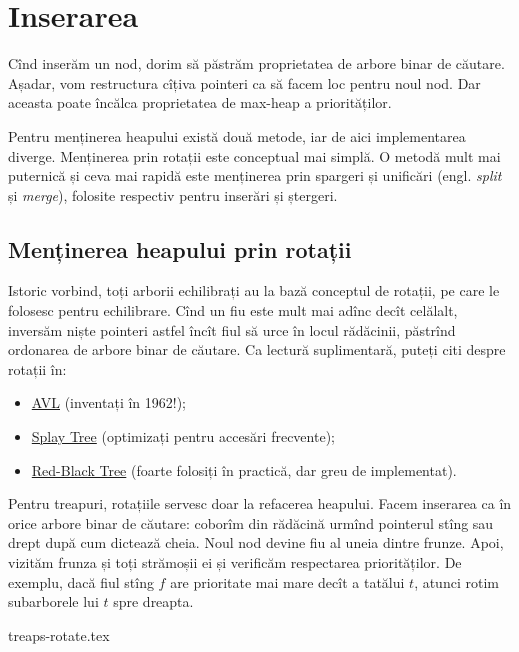 \documentclass[../main.tex]{subfiles}
\begin{document}
\section{Inserarea}

Cînd inserăm un nod, dorim să păstrăm proprietatea de arbore binar de căutare. Așadar, vom restructura cîțiva pointeri ca să facem loc pentru noul nod. Dar aceasta poate încălca proprietatea de max-heap a priorităților.

Pentru menținerea heapului există două metode, iar de aici implementarea diverge. Menținerea prin rotații este conceptual mai simplă. O metodă mult mai puternică și ceva mai rapidă este menținerea prin spargeri și unificări (engl. \textit{split} și \textit{merge}), folosite respectiv pentru inserări și ștergeri.

\subsection{Menținerea heapului prin rotații}

Istoric vorbind, toți arborii echilibrați au la bază conceptul de rotații, pe care le folosesc pentru echilibrare. Cînd un fiu este mult mai adînc decît celălalt, inversăm niște pointeri astfel încît fiul să urce în locul rădăcinii, păstrînd ordonarea de arbore binar de căutare. Ca lectură suplimentară, puteți citi despre rotații în:

\begin{itemize}
  \item \href{https://en.wikipedia.org/wiki/AVL_tree}{AVL} (inventați în 1962!);
  \item \href{https://en.wikipedia.org/wiki/Splay_tree}{Splay Tree} (optimizați pentru accesări frecvente);
  \item \href{https://en.wikipedia.org/wiki/Red\%E2\%80\%93black_tree}{Red-Black Tree} (foarte folosiți în practică, dar greu de implementat).
\end{itemize}

Pentru treapuri, rotațiile servesc doar la refacerea heapului. Facem inserarea ca în orice arbore binar de căutare: coborîm din rădăcină urmînd pointerul stîng sau drept după cum dictează cheia. Noul nod devine fiu al uneia dintre frunze. Apoi, vizităm frunza și toți strămoșii ei și verificăm respectarea priorităților. De exemplu, dacă fiul stîng $f$ are prioritate mai mare decît a tatălui $t$, atunci rotim subarborele lui $t$ spre dreapta.

{treaps-rotate.tex}
\end{document}
